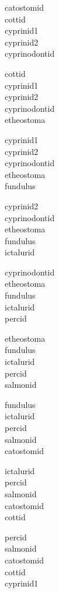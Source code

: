 \documentclass[11pt]{article}
\begin{document}
\thispagestyle{empty}

\begin{multicols*}{3}
	\raggedcolumns
catostomid \\
cottid \\
cyprinid1 \\
cyprinid2 \\
cyprinodontid \bigskip

cottid \\
cyprinid1 \\
cyprinid2 \\
cyprinodontid \\
etheostoma \bigskip

cyprinid1 \\
cyprinid2 \\
cyprinodontid \\
etheostoma \\
fundulus \bigskip

cyprinid2 \\
cyprinodontid \\
etheostoma \\
fundulus \\
ictalurid \bigskip

cyprinodontid \\
etheostoma \\
fundulus \\
ictalurid \\
percid \bigskip

etheostoma \\
fundulus \\
ictalurid \\
percid \\
salmonid \bigskip

fundulus \\
ictalurid \\
percid \\
salmonid\\
catostomid 

\columnbreak

ictalurid \\
percid \\
salmonid\\
catostomid \\
cottid \bigskip

percid \\
salmonid\\
catostomid \\
cottid \\
cyprinid1 \bigskip


\end{multicols*}
\end{document}
